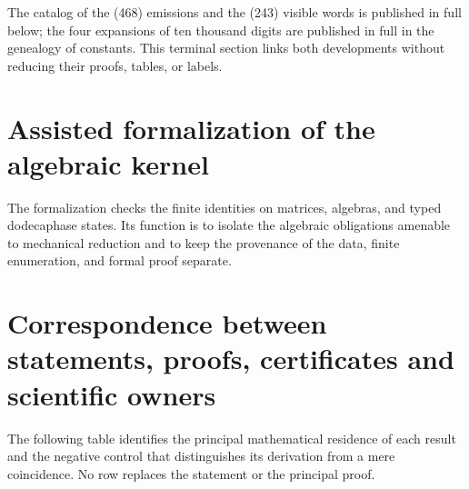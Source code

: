 The catalog of the (468) emissions and the (243) visible words is published
in full below; the four expansions of ten thousand digits are
published in full in the genealogy of constants. This terminal section
links both developments without reducing their proofs, tables, or labels.

\begin{HMTScientificOwnerSubordinated}

\end{HMTScientificOwnerSubordinated}




\chapter{Assisted formalization of the algebraic kernel}
\label{app:formalizacion-asistida-acumulativa}

The formalization checks the finite identities on matrices, algebras, and
typed dodecaphase states. Its function is to isolate the algebraic
obligations amenable to mechanical reduction and to keep the
provenance of the data, finite enumeration, and formal proof separate.

\HMTDemoteHeadings

\HMTRestoreHeadings

\chapter{Correspondence between statements, proofs, certificates and scientific owners}
\label{app:indice-resultados-fuentes-acumulativo}

The following table identifies the principal mathematical residence of each
result and the negative control that distinguishes its derivation from a mere
coincidence. No row replaces the statement or the principal proof.

